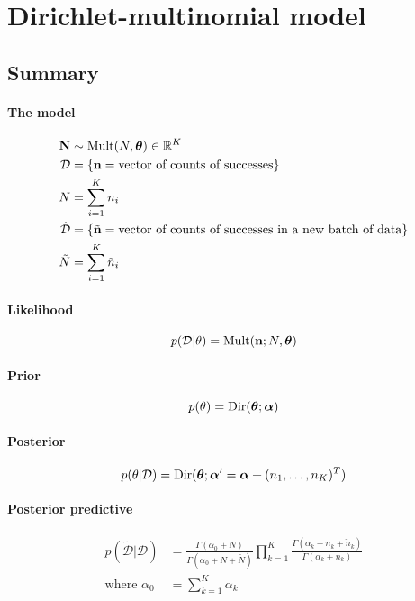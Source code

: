 \section{Dirichlet-multinomial model}
\subsection{Summary}
\paragraph{The model}
    \begin{align}
        \boldsymbol{\mathbf{N}}      &\sim \operatorname{Mult}(N, \boldsymbol{\mathbf{\theta}}) \in \mathbb R^K \\
        \mathcal D  &= \{\boldsymbol{\mathbf{n}} = \text{vector of counts of successes}\} \\
        N           &= \sum_{i = 1}^K n_i \\
        \tilde{\mathcal D} &= \{\tilde{\boldsymbol{\mathbf{n}}} = \text{vector of counts of successes in a new batch of data}\} \\
        \tilde N          &= \sum_{i = 1}^K \tilde n_i
    \end{align}

\paragraph{Likelihood}
    \begin{equation}
        p(\mathcal D | \theta) = \operatorname{Mult}(\boldsymbol{\mathbf{n}}; N, \boldsymbol{\mathbf{\theta}})
    \end{equation}

\paragraph{Prior}
    \begin{equation}
        p(\theta)   = \operatorname{Dir}(\boldsymbol{\mathbf{\theta}}; \boldsymbol{\mathbf{\alpha}})
    \end{equation}

\paragraph{Posterior}
    \begin{equation}
        p(\theta | \mathcal D) = \operatorname{Dir}(\boldsymbol{\mathbf{\theta}}; \boldsymbol{\mathbf{\alpha}}' = \boldsymbol{\mathbf{\alpha}} + (n_1, \dotsc, n_K)^T)
    \end{equation}

\paragraph{Posterior predictive}
    \begin{align}
        p(\tilde{\mathcal D} | \mathcal D) &= \frac{\Gamma(\alpha_0 + N)}{\Gamma(\alpha_0 + N + \tilde N)} \prod_{k = 1}^K \frac{\Gamma(\alpha_k + n_k + \tilde n_k)}{\Gamma(\alpha_k + n_k)} \\
        \text{where } \alpha_0 &= \sum_{k = 1}^K \alpha_k
    \end{align}

